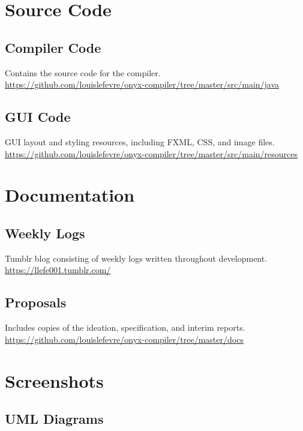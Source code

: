 \documentclass[
]{report}
\begin{document}
\printglossary

\begin{appendices}
	\chapter{Source Code}
	\section{Compiler Code}
	Contains the source code for the compiler.\\
	\url{https://github.com/louislefevre/onyx-compiler/tree/master/src/main/java}
	\section{GUI Code}
	GUI layout and styling resources, including FXML, CSS, and image files.\\
	\url{https://github.com/louislefevre/onyx-compiler/tree/master/src/main/resources}

	\chapter{Documentation}
	\section{Weekly Logs}
	Tumblr blog consisting of weekly logs written throughout development.
	\url{https://llefe001.tumblr.com/}
	\section{Proposals}
	Includes copies of the ideation, specification, and interim reports.
	\url{https://github.com/louislefevre/onyx-compiler/tree/master/docs}
	
	\chapter{Screenshots}
	\section{UML Diagrams}

\end{appendices}
\end{document}

